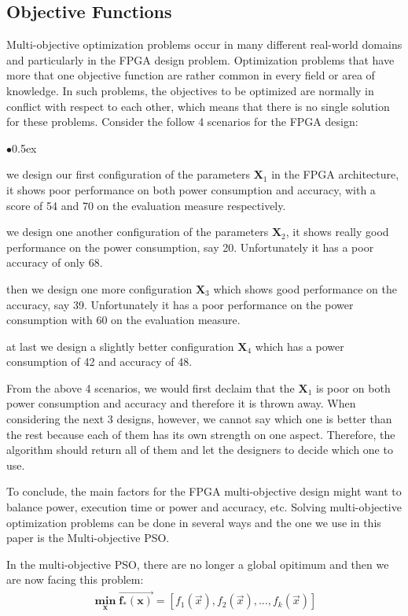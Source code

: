 \documentclass[12pt, runningheads,a4paper]{llncs}
\begin{document}
\subsection{Objective Functions}
Multi-objective optimization problems occur in many different real-world domains and particularly in the FPGA design problem. Optimization problems that have more that one objective function are rather common in every field or area of knowledge. In such problems, the objectives to be optimized are normally in conflict with respect to each other, which means that there is no single solution for these problems. Consider the follow 4 scenarios for the FPGA design:
\begin{list}{$\bullet$}{\itemsep 0.5ex}
\item we design our first configuration of the parameters $\mathbf{X}_1$ in the FPGA architecture, it shows poor performance on both power consumption and accuracy, with a score of 54 and 70 on the evaluation measure respectively. 
\item we design one another configuration of the parameters $\mathbf{X}_2$, it shows really good performance on the power consumption, say 20. Unfortunately it has a poor accuracy of only 68. 
\item then we design one more configuration $\mathbf{X}_3$ which shows good performance on the accuracy, say 39. Unfortunately it has a poor performance on the power consumption with 60 on the evaluation measure. 
\item at last we design a slightly better configuration $\mathbf{X}_4$ which has a power consumption of 42 and  accuracy of 48. 
\end{list}

From the above 4 scenarios, we would first declaim that the $\mathbf{X}_1$ is poor on both power consumption and accuracy and therefore it is thrown away. When considering the next 3 designs, however, we cannot say which one is better than the rest because each of them has its own strength on one aspect. Therefore, the algorithm should return all of them and let the designers to decide which one to use.

To conclude, the main factors for the FPGA multi-objective design might want to balance power, execution time or power and accuracy, etc.  Solving multi-objective optimization problems can be done in several ways and the one we use in this paper is the Multi-objective PSO.

In the multi-objective PSO, there are no longer a global opitimum and then we are now facing this problem:
\begin{align} 
\label{eq:mo1}
\mathbf{\min_x\overrightarrow{f_*(x)}}=[ f_1(\overrightarrow{x} ),f_2 (\overrightarrow{x} ),\ldots,f_k (\overrightarrow{x} ) ]
\end{align} 
\end{document}
